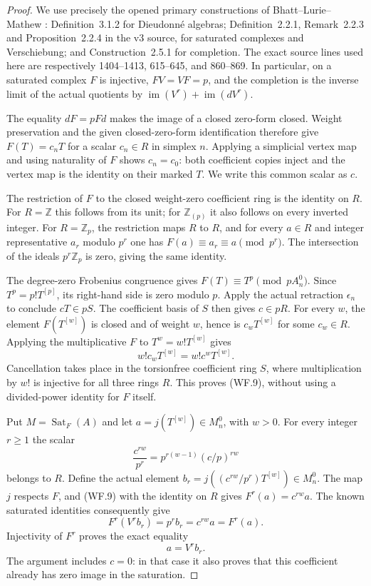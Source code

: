 \begin{proof}
We use precisely the opened primary constructions
of Bhatt--Lurie--Mathew
\cite{Root_BhattLurieMathew2020}: Definition~3.1.2
for Dieudonn\'e algebras; Definition~2.2.1,
Remark~2.2.3 and Proposition~2.2.4 in the v3 source,
for saturated
complexes and Verschiebung; and Construction~2.5.1
for completion. The exact source lines used here
are respectively 1404--1413, 615--645, and 860--869.
In particular, on a saturated complex $F$ is
injective, $FV=VF=p$, and the completion is the
inverse limit of the actual quotients by
$\operatorname{im}(V^r)+\operatorname{im}(dV^r)$.

The equality $dF=pFd$ makes the image of a closed
zero-form closed. Weight preservation and the
given closed-zero-form identification therefore
give $F(T)=c_n T$ for a scalar $c_n\in R$ in
simplex $n$. Applying a simplicial vertex map
and using naturality of $F$ shows $c_n=c_0$:
both coefficient copies inject and the vertex
map is the identity on their marked $T$.
We write this common scalar as $c$.

The restriction of $F$ to the closed weight-zero
coefficient ring is the identity on $R$. For
$R=\mathbb Z$ this follows from its unit; for
$\mathbb Z_{(p)}$ it also follows on every inverted
integer. For $R=\mathbb Z_p$, the restriction
maps $R$ to $R$, and for every $a\in R$ and
integer representative $a_r$ modulo $p^r$ one
has $F(a)\equiv a_r\equiv a\pmod{p^r}$.
The intersection of the ideals $p^r\mathbb Z_p$
is zero, giving the same identity.

The degree-zero Frobenius congruence gives
$F(T)\equiv T^p\pmod{pA_n^0}$. Since
$T^p=p!T^{[p]}$, its right-hand side is zero
modulo $p$. Apply the actual retraction
$\epsilon_n$ to conclude $cT\in pS$.
The coefficient basis of $S$ then gives $c\in pR$.
For every $w$, the element $F(T^{[w]})$ is closed
and of weight $w$, hence is $c_w T^{[w]}$ for
some $c_w\in R$. Applying the multiplicative $F$
to $T^w=w!T^{[w]}$ gives
\[
                     w!c_w T^{[w]}
                          =w!c^wT^{[w]}.
 \tag{WF.11}
\]
Cancellation takes place in the torsionfree
coefficient ring $S$, where multiplication by
$w!$ is injective for all three rings $R$.
This proves (WF.9), without using a divided-power
identity for $F$ itself.

Put $M=\operatorname{Sat}_F(A)$ and let
$a=j(T^{[w]})\in M_n^0$, with $w>0$.
For every integer $r\geq1$ the scalar
\[
            \frac{c^{rw}}{p^r}
             =p^{r(w-1)}(c/p)^{rw}
 \tag{WF.12}
\]
belongs to $R$. Define the actual element
$b_r=j((c^{rw}/p^r)T^{[w]})\in M_n^0$.
The map $j$ respects $F$, and (WF.9) with the
identity on $R$ gives $F^r(a)=c^{rw}a$.
The known saturated identities consequently give
\[
 F^r(V^r b_r)=p^r b_r=c^{rw}a=F^r(a).
 \tag{WF.13}
\]
Injectivity of $F^r$ proves the exact equality
\[
                              a=V^r b_r.
 \tag{WF.14}
\]
The argument includes $c=0$: in that case it
also proves that this coefficient already has
zero image in the saturation.


\end{proof}
